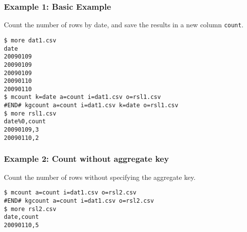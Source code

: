 \subsubsection*{Example 1: Basic Example}

Count the number of rows by date, and save the results in a new column \verb|count|.


\begin{Verbatim}[baselinestretch=0.7,frame=single]
$ more dat1.csv
date
20090109
20090109
20090109
20090110
20090110
$ mcount k=date a=count i=dat1.csv o=rsl1.csv
#END# kgcount a=count i=dat1.csv k=date o=rsl1.csv
$ more rsl1.csv
date%0,count
20090109,3
20090110,2
\end{Verbatim}
\subsubsection*{Example 2: Count without aggregate key}

Count the number of rows without specifying the aggregate key.


\begin{Verbatim}[baselinestretch=0.7,frame=single]
$ mcount a=count i=dat1.csv o=rsl2.csv
#END# kgcount a=count i=dat1.csv o=rsl2.csv
$ more rsl2.csv
date,count
20090110,5
\end{Verbatim}
